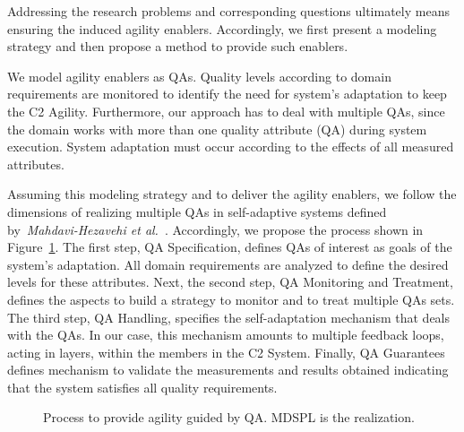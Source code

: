 Addressing the research problems and corresponding questions ultimately means ensuring the induced agility enablers. Accordingly, we first present a modeling strategy and then propose a method to provide such enablers.

We model agility enablers as QAs. Quality levels according to domain requirements are monitored to identify the need for system's adaptation to keep the C2 Agility. Furthermore, our approach has to deal with multiple QAs, since the domain works with more than one quality attribute (QA) during system execution. System adaptation must occur according to the effects of all measured attributes. 

Assuming this modeling strategy and to deliver the agility enablers, we follow the dimensions of realizing multiple QAs in self-adaptive systems defined by~\textit{Mahdavi-Hezavehi et al.}~\cite{SAS_001}. Accordingly, we propose the process shown in Figure~\ref{process}. The first step, QA Specification, defines QAs of interest as goals of the system's adaptation. All domain requirements are analyzed to define the desired levels for these attributes. Next, the second step, QA Monitoring and Treatment, defines the aspects to build a strategy to monitor and to treat multiple QAs sets. The third step, QA Handling, specifies the self-adaptation mechanism that deals with the QAs.   In our case, this mechanism amounts to multiple feedback loops, acting in layers, within the members in the C2 System. Finally, QA Guarantees defines mechanism to validate the measurements and results obtained indicating that the system satisfies all quality requirements.

\begin{figure}[h]
\centering
\scalebox{.8}{}
\label{process}
\caption{Process to provide agility guided by QA. MDSPL is the realization.}
\end{figure}
  


